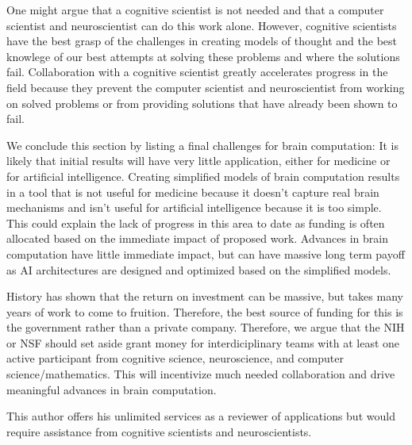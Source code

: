 \documentclass{article}
\begin{document}
One might argue that a cognitive scientist is not needed and that a computer scientist and neuroscientist can do this work alone. However, cognitive scientists have the best grasp of the challenges in creating models of thought and the best knowlege of our best attempts at solving these problems and where the solutions fail. Collaboration with a cognitive scientist greatly accelerates progress in the field because they prevent the computer scientist and neuroscientist from working on solved problems or from providing solutions that have already been shown to fail.

We conclude this section by listing a final challenges for brain computation: It is likely that initial results will have very little application, either for medicine or for artificial intelligence. Creating simplified models of brain computation results in a tool that is not useful for medicine because it doesn't capture real brain mechanisms and isn't useful for artificial intelligence because it is too simple. This could explain the lack of progress in this area to date as funding is often allocated based on the immediate impact of proposed work. Advances in brain computation have little immediate impact, but can have massive long term payoff as AI architectures are designed and optimized based on the simplified models.

History has shown that the return on investment can be massive, but takes many years of work to come to fruition. Therefore, the best source of funding for this is the government rather than a private company. Therefore, we argue that the NIH or NSF should set aside grant money for interdiciplinary teams with at least one active participant from cognitive science, neuroscience, and computer science/mathematics. This will incentivize much needed collaboration and drive meaningful advances in brain computation.

This author offers his unlimited services as a reviewer of applications but would require assistance from cognitive scientists and neuroscientists.



\end{document}
